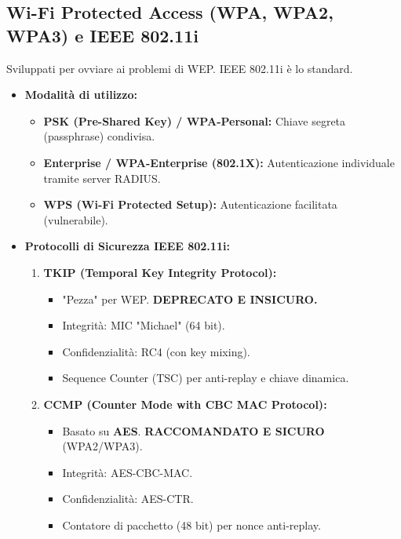 \documentclass{article}
\begin{document}
\subsection{Wi-Fi Protected Access (WPA, WPA2, WPA3) e IEEE 802.11i}
Sviluppati per ovviare ai problemi di WEP. IEEE 802.11i è lo standard.
\begin{itemize}
    \item \textbf{Modalità di utilizzo:}
    \begin{itemize}
        \item \textbf{PSK (Pre-Shared Key) / WPA-Personal:} Chiave segreta (passphrase) condivisa.
        \item \textbf{Enterprise / WPA-Enterprise (802.1X):} Autenticazione individuale tramite server RADIUS.
        \item \textbf{WPS (Wi-Fi Protected Setup):} Autenticazione facilitata (vulnerabile).
    \end{itemize}
    \item \textbf{Protocolli di Sicurezza IEEE 802.11i:}
    \begin{enumerate}
        \item \textbf{TKIP (Temporal Key Integrity Protocol):}
        \begin{itemize}
            \item "Pezza" per WEP. \textbf{DEPRECATO E INSICURO.}
            \item Integrità: MIC "Michael" (64 bit).
            \item Confidenzialità: RC4 (con key mixing).
            \item Sequence Counter (TSC) per anti-replay e chiave dinamica.
        \end{itemize}
        \item \textbf{CCMP (Counter Mode with CBC MAC Protocol):}
        \begin{itemize}
            \item Basato su \textbf{AES}. \textbf{RACCOMANDATO E SICURO} (WPA2/WPA3).
            \item Integrità: AES-CBC-MAC.
            \item Confidenzialità: AES-CTR.
            \item Contatore di pacchetto (48 bit) per nonce anti-replay.
        \end{itemize}
    \end{enumerate}
\end{itemize}
\end{document}
